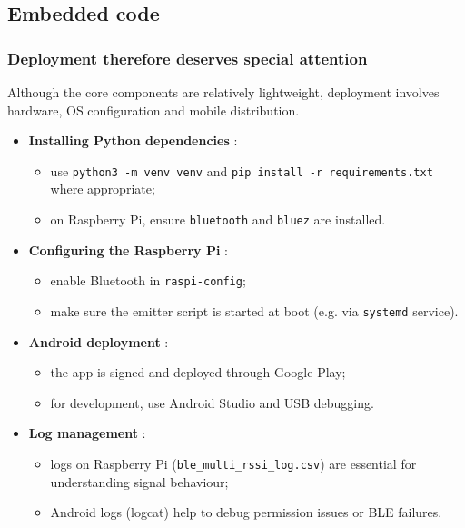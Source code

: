 \documentclass[12pt,a4paper]{article}
\begin{document}
\pagebreak

\subsection{Embedded code}

\subsubsection{Deployment therefore deserves special attention}

Although the core components are relatively lightweight, deployment involves hardware, OS configuration and mobile distribution.

\begin{itemize}
    \item \textbf{Installing Python dependencies} :
    \begin{itemize}
        \item use \texttt{python3 -m venv venv} and \texttt{pip install -r requirements.txt} where appropriate;
        \item on Raspberry Pi, ensure \texttt{bluetooth} and \texttt{bluez} are installed.
    \end{itemize}

    \item \textbf{Configuring the Raspberry Pi} :
    \begin{itemize}
        \item enable Bluetooth in \texttt{raspi-config};
        \item make sure the emitter script is started at boot (e.g. via \texttt{systemd} service).
    \end{itemize}

    \item \textbf{Android deployment} :
    \begin{itemize}
        \item the app is signed and deployed through Google Play;
        \item for development, use Android Studio and USB debugging.
    \end{itemize}

    \item \textbf{Log management} :
    \begin{itemize}
        \item logs on Raspberry Pi (\texttt{ble\_multi\_rssi\_log.csv}) are essential for understanding signal behaviour;
        \item Android logs (logcat) help to debug permission issues or BLE failures.
    \end{itemize}
\end{itemize}
\end{document}
